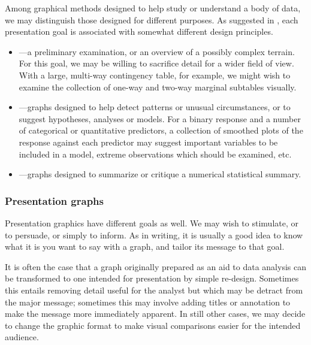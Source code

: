 Among graphical methods designed to help study or understand
a body of data, we may distinguish those designed for different
purposes.  As suggested in , each presentation goal
is associated with somewhat different design principles.
\begin{itemize}
\item {}---a preliminary examination, or an overview of a possibly complex terrain.
For this goal, we may be willing to sacrifice detail for a wider field of
view.
With a large, multi-way contingency table, for example, we might wish to
examine the collection of one-way and two-way marginal subtables
visually.  
\item {}---graphs designed to help detect patterns or unusual
circumstances, or to suggest hypotheses, analyses or models.
For a binary response and a number of categorical or quantitative predictors,
a collection of smoothed plots of the response against each predictor
may suggest important variables to be included in a model,
extreme observations which should be examined, etc.
\item {}---graphs designed to summarize or critique
a numerical statistical summary.
\end{itemize}

\subsubsection{Presentation graphs}
Presentation graphics have different goals as well.
We may wish to stimulate, or to persuade, or simply to inform.
As in writing, it is usually a good idea to know what it is you
want to say with a graph, and tailor its message to that goal.

It is often the case that a graph originally prepared as an aid
to data analysis can be transformed to one intended for presentation
by simple re-design.
Sometimes this entails removing detail useful for the analyst
but which may be detract from the major message;
sometimes this may involve adding titles or annotation to make the
message more immediately apparent.
In still other cases, we may decide to change the graphic format
to make visual comparisons easier for the intended audience.

